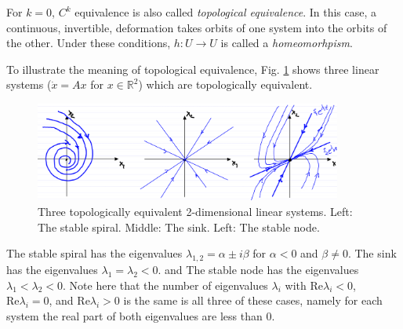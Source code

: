 \begin{definition}
	For $k=0$, $C^{k}$ equivalence is also called \emph{topological equivalence}. In this case, a continuous, invertible, deformation takes orbits of one system into the orbits of the other. Under these conditions,  $h:U\to U$ is called a \emph{homeomorhpism}.
\end{definition}
\begin{ex}[Topologically equivalent linear systems for $n=2$]
	To illustrate the meaning of topological equivalence, Fig. \ref{fig:topo_equiv} shows three linear systems ($\dot{{x} } = {Ax}  $ for $x\in \mathbb{R}^2$) which are topologically equivalent.
	\begin{figure}[h!]
		\centering
		\includegraphics[width=0.9\textwidth]{figures/ch2/13topo_equiv.png}
		\caption{Three topologically equivalent 2-dimensional linear systems. Left: The stable spiral. Middle: The sink. Left: The stable node.}
		\label{fig:topo_equiv}
	\end{figure}

The stable spiral has the eigenvalues $\lambda _{1,2}= \alpha \pm i \beta $ for $\alpha <0$ and $\beta \neq 0$. The sink has the eigenvalues $\lambda_1=\lambda_2<0$. and The stable node has the eigenvalues $\lambda_1 < \lambda_2 < 0$. Note here that the number of eigenvalues $\lambda_i$ with $ \textrm{Re} \lambda_i <0$, $ \textrm{Re} \lambda _i=0$, and $ \textrm{Re} \lambda _i>0$ is the same is all three of these cases, namely for each system the real part of both eigenvalues are less than 0.	
\end{ex}

